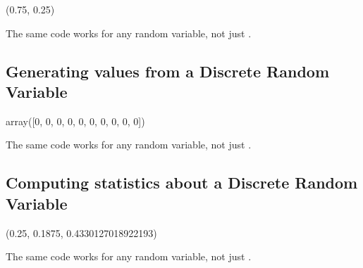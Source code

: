 \documentclass[letterpaper,10pt,english]{sphinxmanual}
\begin{document}
\begin{sphinxVerbatim}[commandchars=\\\{\}]
(0.75, 0.25)
\end{sphinxVerbatim}

The same code works for any random variable, not just .


\subsection{Generating values from a Discrete Random Variable}
\label{\detokenize{GB213-review-in-Python:generating-values-from-a-discrete-random-variable}}
\begin{sphinxVerbatim}[commandchars=\\\{\}]
    
\end{sphinxVerbatim}

\begin{sphinxVerbatim}[commandchars=\\\{\}]
array([0, 0, 0, 0, 0, 0, 0, 0, 0, 0])
\end{sphinxVerbatim}

The same code works for any random variable, not just .


\subsection{Computing statistics about a Discrete Random Variable}
\label{\detokenize{GB213-review-in-Python:computing-statistics-about-a-discrete-random-variable}}
\begin{sphinxVerbatim}[commandchars=\\\{\}]
    
\end{sphinxVerbatim}

\begin{sphinxVerbatim}[commandchars=\\\{\}]
(0.25, 0.1875, 0.4330127018922193)
\end{sphinxVerbatim}

The same code works for any random variable, not just .
\end{document}
